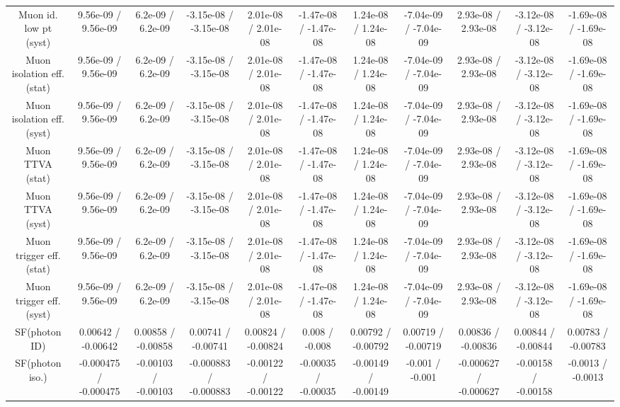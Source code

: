 \begin{table}[htbp]
\begin{center}
\begin{tabular}{|c|c|c|c|c|c|c|c|c|c|c|}
  Muon id. low pt (syst) & 9.56e-09 / 9.56e-09 & 6.2e-09 / 6.2e-09 & -3.15e-08 / -3.15e-08 & 2.01e-08 / 2.01e-08 & -1.47e-08 / -1.47e-08 & 1.24e-08 / 1.24e-08 & -7.04e-09 / -7.04e-09 & 2.93e-08 / 2.93e-08 & -3.12e-08 / -3.12e-08 & -1.69e-08 / -1.69e-08 \\ 
  Muon isolation eff. (stat) & 9.56e-09 / 9.56e-09 & 6.2e-09 / 6.2e-09 & -3.15e-08 / -3.15e-08 & 2.01e-08 / 2.01e-08 & -1.47e-08 / -1.47e-08 & 1.24e-08 / 1.24e-08 & -7.04e-09 / -7.04e-09 & 2.93e-08 / 2.93e-08 & -3.12e-08 / -3.12e-08 & -1.69e-08 / -1.69e-08 \\ 
  Muon isolation eff. (syst) & 9.56e-09 / 9.56e-09 & 6.2e-09 / 6.2e-09 & -3.15e-08 / -3.15e-08 & 2.01e-08 / 2.01e-08 & -1.47e-08 / -1.47e-08 & 1.24e-08 / 1.24e-08 & -7.04e-09 / -7.04e-09 & 2.93e-08 / 2.93e-08 & -3.12e-08 / -3.12e-08 & -1.69e-08 / -1.69e-08 \\ 
  Muon TTVA (stat) & 9.56e-09 / 9.56e-09 & 6.2e-09 / 6.2e-09 & -3.15e-08 / -3.15e-08 & 2.01e-08 / 2.01e-08 & -1.47e-08 / -1.47e-08 & 1.24e-08 / 1.24e-08 & -7.04e-09 / -7.04e-09 & 2.93e-08 / 2.93e-08 & -3.12e-08 / -3.12e-08 & -1.69e-08 / -1.69e-08 \\ 
  Muon TTVA (syst) & 9.56e-09 / 9.56e-09 & 6.2e-09 / 6.2e-09 & -3.15e-08 / -3.15e-08 & 2.01e-08 / 2.01e-08 & -1.47e-08 / -1.47e-08 & 1.24e-08 / 1.24e-08 & -7.04e-09 / -7.04e-09 & 2.93e-08 / 2.93e-08 & -3.12e-08 / -3.12e-08 & -1.69e-08 / -1.69e-08 \\ 
  Muon trigger eff. (stat) & 9.56e-09 / 9.56e-09 & 6.2e-09 / 6.2e-09 & -3.15e-08 / -3.15e-08 & 2.01e-08 / 2.01e-08 & -1.47e-08 / -1.47e-08 & 1.24e-08 / 1.24e-08 & -7.04e-09 / -7.04e-09 & 2.93e-08 / 2.93e-08 & -3.12e-08 / -3.12e-08 & -1.69e-08 / -1.69e-08 \\ 
  Muon trigger eff. (syst) & 9.56e-09 / 9.56e-09 & 6.2e-09 / 6.2e-09 & -3.15e-08 / -3.15e-08 & 2.01e-08 / 2.01e-08 & -1.47e-08 / -1.47e-08 & 1.24e-08 / 1.24e-08 & -7.04e-09 / -7.04e-09 & 2.93e-08 / 2.93e-08 & -3.12e-08 / -3.12e-08 & -1.69e-08 / -1.69e-08 \\ 
  SF(photon ID) & 0.00642 / -0.00642 & 0.00858 / -0.00858 & 0.00741 / -0.00741 & 0.00824 / -0.00824 & 0.008 / -0.008 & 0.00792 / -0.00792 & 0.00719 / -0.00719 & 0.00836 / -0.00836 & 0.00844 / -0.00844 & 0.00783 / -0.00783 \\ 
  SF(photon iso.) & -0.000475 / -0.000475 & -0.00103 / -0.00103 & -0.000883 / -0.000883 & -0.00122 / -0.00122 & -0.00035 / -0.00035 & -0.00149 / -0.00149 & -0.001 / -0.001 & -0.000627 / -0.000627 & -0.00158 / -0.00158 & -0.0013 / -0.0013 \\ 

\end{tabular}
\end{center}
\end{table}
